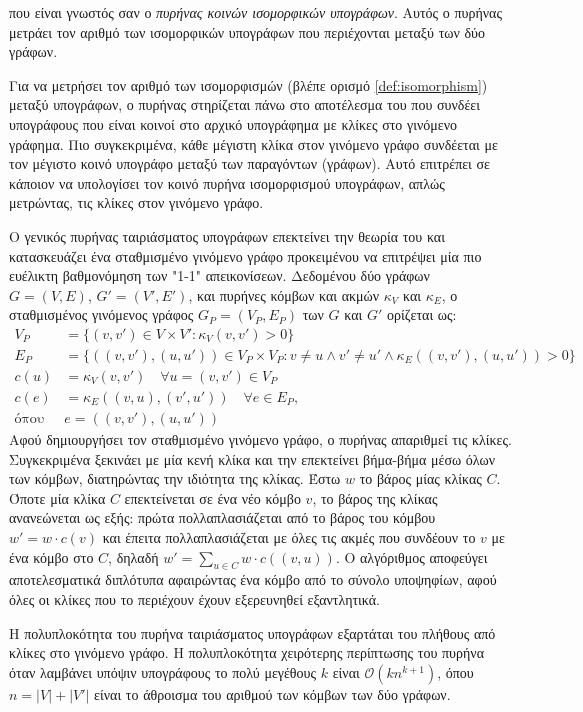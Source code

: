 που είναι γνωστός σαν ο \textit{πυρήνας κοινών ισομορφικών υπογράφων}.
Αυτός ο πυρήνας μετράει τον αριθμό των ισομορφικών υπογράφων που περιέχονται μεταξύ των δύο γράφων.\par
Για να μετρήσει τον αριθμό των ισομορφισμών (βλέπε ορισμό \ref{def:isomorphism}) μεταξύ υπογράφων, ο πυρήνας στηρίζεται πάνω στο αποτέλεσμα του  \cite{levi1973note} που συνδέει υπογράφους που είναι κοινοί στο αρχικό υπογράφημα με κλίκες στο γινόμενο γράφημα.
Πιο συγκεκριμένα, κάθε μέγιστη κλίκα στον γινόμενο γράφο συνδέεται με τον μέγιστο κοινό υπογράφο μεταξύ των παραγόντων (γράφων).
Αυτό επιτρέπει σε κάποιον να υπολογίσει τον κοινό πυρήνα ισομορφισμού υπογράφων, απλώς μετρώντας, τις κλίκες στον γινόμενο γράφο.\par
Ο γενικός πυρήνας ταιριάσματος υπογράφων επεκτείνει την θεωρία του  και κατασκευάζει ένα σταθμισμένο γινόμενο γράφο προκειμένου να επιτρέψει μία πιο ευέλικτη βαθμονόμηση των "1-1" απεικονίσεων.
Δεδομένου δύο γράφων $G=(V,E)$, $G'=(V',E')$, και πυρήνες κόμβων και ακμών $\kappa_V$ και $\kappa_E$, ο σταθμισμένος γινόμενος γράφος $G_P=(V_P, E_P)$ των $G$ και $G'$ ορίζεται ως:
\begin{equation}
    \begin{split}
        V_P &= \{ (v,v') \in V \times V' : \kappa_V(v,v') > 0 \} \\
        E_P &= \{ ((v,v'),(u,u')) \in V_P \times V_P : v \neq u \wedge v' \neq u' \wedge \kappa_E((v,v'),(u,u')) > 0 \} \\
        c(u) &= \kappa_V(v,v') \quad \forall u=(v,v') \in V_P \\
        c(e) &= \kappa_E((v,u),(v',u')) \quad \forall e \in E_P, \\
        \text{όπου } &e=((v,v'),(u,u')) 
    \end{split}
\end{equation}
Αφού δημιουργήσει τον σταθμισμένο γινόμενο γράφο, ο πυρήνας απαριθμεί τις κλίκες.
Συγκεκριμένα ξεκινάει με μία κενή κλίκα και την επεκτείνει βήμα-βήμα μέσω όλων των κόμβων, διατηρώντας την ιδιότητα της κλίκας. 
Έστω $w$ το βάρος μίας κλίκας $C$.
Όποτε μία κλίκα $C$ επεκτείνεται σε ένα νέο κόμβο $v$, το βάρος της κλίκας ανανεώνεται ως εξής: πρώτα πολλαπλασιάζεται από το βάρος του κόμβου $w' = w \cdot c(v)$ και έπειτα πολλαπλασιάζεται με όλες τις ακμές που συνδέουν το $v$ με ένα κόμβο στο $C$, δηλαδή $w' = \sum_{u \in C} w \cdot c((v,u))$.
Ο αλγόριθμος αποφεύγει αποτελεσματικά διπλότυπα αφαιρώντας ένα κόμβο από το σύνολο υποψηφίων, αφού όλες οι κλίκες που το περιέχουν έχουν εξερευνηθεί εξαντλητικά.\par
Η πολυπλοκότητα του πυρήνα ταιριάσματος υπογράφων εξαρτάται του πλήθους από κλίκες στο γινόμενο γράφο.
Η πολυπλοκότητα χειρότερης περίπτωσης του πυρήνα όταν λαμβάνει υπόψιν υπογράφους το πολύ μεγέθους $k$ είναι $\mathcal{O}(kn^{k+1})$, όπου $n=|V|+|V'|$ είναι το άθροισμα του αριθμού των κόμβων των δύο γράφων.

